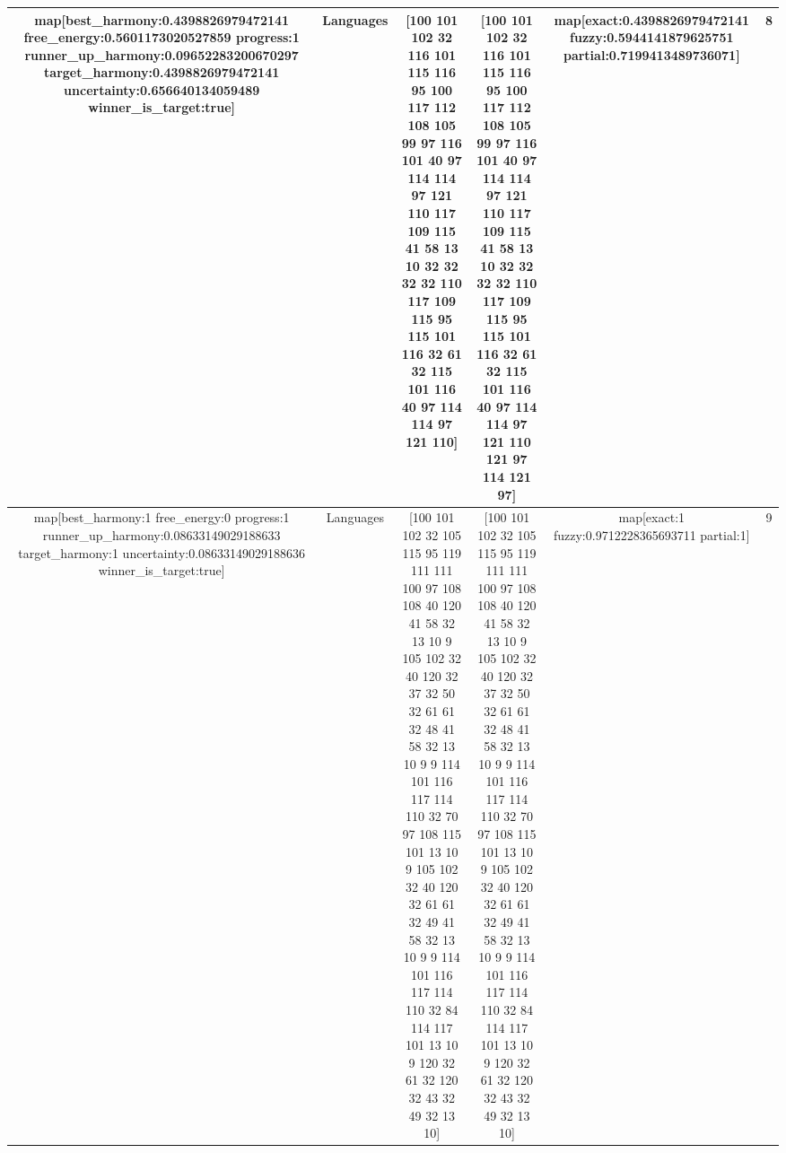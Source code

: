 \begin{table}[h]
\begin{tabular}{ |c|c|c|c|c|c| }
\hline
map[best_harmony:0.4398826979472141 free_energy:0.5601173020527859 progress:1 runner_up_harmony:0.09652283200670297 target_harmony:0.4398826979472141 uncertainty:0.656640134059489 winner_is_target:true] & Languages & [100 101 102 32 116 101 115 116 95 100 117 112 108 105 99 97 116 101 40 97 114 114 97 121 110 117 109 115 41 58 13 10 32 32 32 32 110 117 109 115 95 115 101 116 32 61 32 115 101 116 40 97 114 114 97 121 110] & [100 101 102 32 116 101 115 116 95 100 117 112 108 105 99 97 116 101 40 97 114 114 97 121 110 117 109 115 41 58 13 10 32 32 32 32 110 117 109 115 95 115 101 116 32 61 32 115 101 116 40 97 114 114 97 121 110 121 97 114 121 97] & map[exact:0.4398826979472141 fuzzy:0.5944141879625751 partial:0.7199413489736071] & 8 \\
\hline
map[best_harmony:1 free_energy:0 progress:1 runner_up_harmony:0.08633149029188633 target_harmony:1 uncertainty:0.08633149029188636 winner_is_target:true] & Languages & [100 101 102 32 105 115 95 119 111 111 100 97 108 108 40 120 41 58 32 13 10 9 105 102 32 40 120 32 37 32 50 32 61 61 32 48 41 58 32 13 10 9 9 114 101 116 117 114 110 32 70 97 108 115 101 13 10 9 105 102 32 40 120 32 61 61 32 49 41 58 32 13 10 9 9 114 101 116 117 114 110 32 84 114 117 101 13 10 9 120 32 61 32 120 32 43 32 49 32 13 10] & [100 101 102 32 105 115 95 119 111 111 100 97 108 108 40 120 41 58 32 13 10 9 105 102 32 40 120 32 37 32 50 32 61 61 32 48 41 58 32 13 10 9 9 114 101 116 117 114 110 32 70 97 108 115 101 13 10 9 105 102 32 40 120 32 61 61 32 49 41 58 32 13 10 9 9 114 101 116 117 114 110 32 84 114 117 101 13 10 9 120 32 61 32 120 32 43 32 49 32 13 10] & map[exact:1 fuzzy:0.9712228365693711 partial:1] & 9 \\
\hline
\end{tabular}
\end{table}
